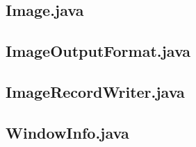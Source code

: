 \documentclass[12pt,a4paper]{extarticle} %
\begin{document}
\subsection*{Image.java}

\subsection*{ImageOutputFormat.java}

\subsection*{ImageRecordWriter.java}

\subsection*{WindowInfo.java}

%
%
\end{document}

